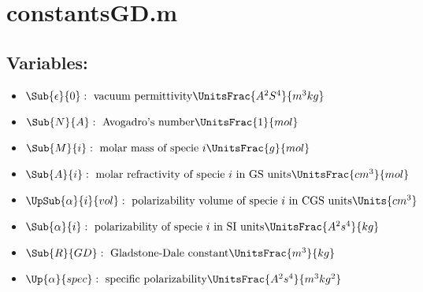 





    \section{\bf{\Large{constantsGD.m}}}
        \subsection*{Variables:}
            \begin{itemize}
                \item $ \Sub{\epsilon}{0}:\text{ vacuum permittivity}\UnitsFrac{A^2S^4}{m^3kg} $ 
                \item $ \Sub{N}{A}:\text{ Avogadro's number}\UnitsFrac{1}{mol} $
                \item $ \Sub{M}{i}:\text{ molar mass of specie }i\UnitsFrac{g}{mol} $
                \item $ \Sub{A}{i}: \text{ molar refractivity of specie }i\text{ in GS units}\UnitsFrac{cm^3}{mol} $ 
                \item $ \UpSub{\alpha}{i}{vol}:\text{ polarizability volume of specie }i\text{ in CGS units}\Units{cm^3} $
                \item $ \Sub{\alpha}{i}:\text{ polarizability of specie }i\text{ in SI units}\UnitsFrac{A^2s^4}{kg} $
                \item $ \Sub{R}{GD}:\text{ Gladstone-Dale constant}\UnitsFrac{m^3}{kg} $
                \item $ \Up{\alpha}{spec}:\text{ specific polarizability}\UnitsFrac{A^2s^4}{m^3kg^2} $
            \end{itemize}
        
